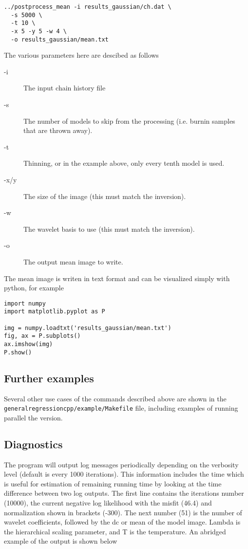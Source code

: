 \documentclass[a4paper,12pt]{article}
\begin{document}
\begin{verbatim}
../postprocess_mean -i results_gaussian/ch.dat \
  -s 5000 \
  -t 10 \
  -x 5 -y 5 -w 4 \
  -o results_gaussian/mean.txt
\end{verbatim}

The various parameters here are descibed as follows

\begin{description}
\item[-i] The input chain history file
\item[-s] The number of models to skip from the processing (i.e. burnin samples that
  are thrown away).
\item[-t] Thinning, or in the example above, only every tenth model is used.
\item[-x/y] The size of the image (this must match the inversion).
\item[-w] The wavelet basis to use (this must match the inversion).
\item[-o] The output mean image to write.
\end{description}

The mean image is writen in text format and can be visualized simply
with python, for example

\begin{verbatim}
import numpy
import matplotlib.pyplot as P

img = numpy.loadtxt('results_gaussian/mean.txt')
fig, ax = P.subplots()
ax.imshow(img)
P.show()
\end{verbatim}

\subsection{Further examples}

Several other use cases of the commands described above are shown in the
{\tt generalregressioncpp/example/Makefile} file, including examples
of running parallel the version.
  
\subsection{Diagnostics}

The program will output log messages periodically depending on the
verbosity level (default is every 1000 iterations). This information
includes the time which is useful for estimation of remaining running
time by looking at the time difference between two log outputs.  The
first line contains the iterations number (10000), the current
negative log likelihood with the misfit (46.4) and normalization shown
in brackets (-300). The next number (51) is the number of wavelet
coefficients, followed by the dc or mean of the model image. Lambda is
the hierarchical scaling parameter, and T is the temperature.  An
abridged example of the output is shown below
\end{document}
